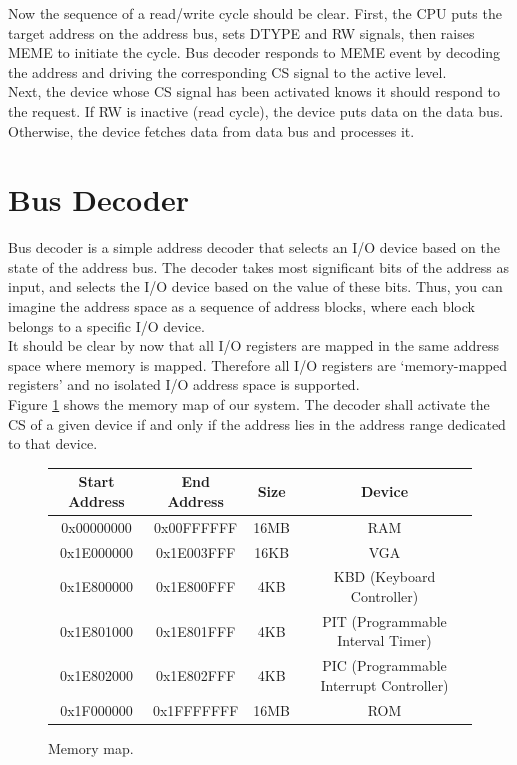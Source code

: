 \documentclass[oneside]{book}
\begin{document}
Now the sequence of a read/write cycle should be clear. First, the CPU puts
the target address on the address bus, sets DTYPE and RW signals, then raises
MEME to initiate the cycle. Bus decoder responds to MEME event by decoding 
the address and driving the corresponding CS signal to the active level.\\

Next, the device whose CS signal has been activated knows it should respond to
the request. If RW is inactive (read cycle), the device puts data on the data
bus. Otherwise, the device fetches data from data bus and processes it.\\

\section{Bus Decoder}

Bus decoder is a simple address decoder that selects an I/O device based on
the state of the address bus. The decoder takes most significant bits of the
address as input, and selects the I/O device based on the value of these bits.
Thus, you can imagine the address space as a sequence of address blocks, where
each block belongs to a specific I/O device.\\

It should be clear by now that all I/O registers are mapped in the same
address space where memory is mapped. Therefore all I/O registers are
`memory-mapped registers' and no isolated I/O address space is supported.\\

Figure \ref{memmap} shows the memory map of our system. The decoder shall activate
the CS of a given device if and only if the address lies in the address range
dedicated to that device.

\begin{figure}[H]
\begin{center}
\begin{tabular}{|c|c|c|c|}

\hline \textbf{Start Address} & \textbf{End Address} &
       \textbf{Size} & \textbf{Device} \\

\hline 0x00000000 & 0x00FFFFFF & 16MB & RAM \\
\hline 0x1E000000 & 0x1E003FFF & 16KB & VGA \\
\hline 0x1E800000 & 0x1E800FFF &  4KB & KBD (Keyboard Controller) \\
\hline 0x1E801000 & 0x1E801FFF &  4KB & PIT (Programmable Interval Timer) \\
\hline 0x1E802000 & 0x1E802FFF &  4KB & PIC (Programmable Interrupt 
                                                              Controller) \\
\hline 0x1F000000 & 0x1FFFFFFF & 16MB & ROM \\

\hline

\end{tabular}
\end{center}
\caption{Memory map.}
\label{memmap}
\end{figure}
\end{document}
